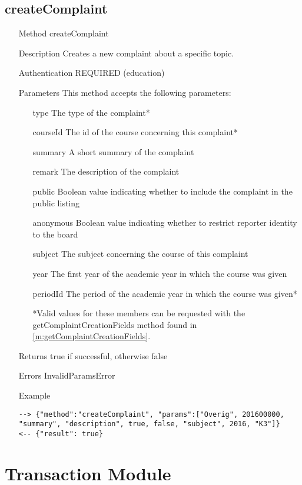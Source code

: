 \documentclass[a4paper]{scrreprt}
\begin{document}
\subsection{createComplaint}
\begin{enumerate}
\item[Method] createComplaint
\item[Description] Creates a new complaint about a specific topic.
\item[Authentication] REQUIRED (education)
\item[Parameters] This method accepts the following parameters:
\begin{enumerate}
	\item[type] The type of the complaint*
    \item[courseId] The id of the course concerning this complaint*
    \item[summary] A short summary of the complaint
    \item[remark] The description of the complaint
    \item[public] Boolean value indicating whether to include the complaint in the public listing
    \item[anonymous] Boolean value indicating whether to restrict reporter identity to the board
    \item[subject] The subject concerning the course of this complaint
    \item[year] The first year of the academic year in which the course was given
    \item[periodId] The period of the academic year in which the course was given*
    \item[] *Valid values for these members can be requested with the getComplaintCreationFields method found in \autoref{m:getComplaintCreationFields}.
    \end{enumerate}
\item[Returns] true if successful, otherwise false
\item[Errors] InvalidParamsError
\item[Example]
\begin{lstlisting}
--> {"method":"createComplaint", "params":["Overig", 201600000, "summary", "description", true, false, "subject", 2016, "K3"]}
<-- {"result": true}
\end{lstlisting}
\end{enumerate}


\clearpage
\section{Transaction Module}
\end{document}
